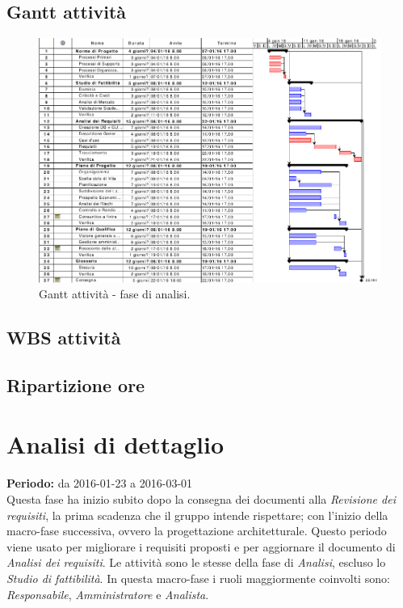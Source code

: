 \documentclass[a4paper]{report}
\begin{document}
			\subsection{Gantt attività}
				\begin{figure}[H]
					\centering
					\includegraphics[scale=0.4]{gantt-analisi}
					\caption{Gantt attività - fase di analisi.}
				\end{figure}
			\subsection{WBS attività}
			\subsection{Ripartizione ore}

		\section{Analisi di dettaglio}
			\textbf{Periodo:} da 2016-01-23 a 2016-03-01 \\
			Questa fase ha inizio subito dopo la consegna dei documenti alla \emph{Revisione dei requisiti}, la
			prima scadenza che il gruppo intende rispettare; con l'inizio della macro-fase successiva, ovvero la 
			progettazione architetturale.
			Questo periodo viene usato per migliorare i requisiti proposti e per aggiornare il documento di 
			\emph{Analisi dei requisiti}. 
			Le attività sono le stesse della fase di \emph{Analisi}, escluso lo \emph{Studio di fattibilità}. 
			In questa macro-fase i ruoli maggiormente coinvolti sono: \emph{Responsabile}, \emph{Amministratore} 
			e \emph{Analista}.
\end{document}
